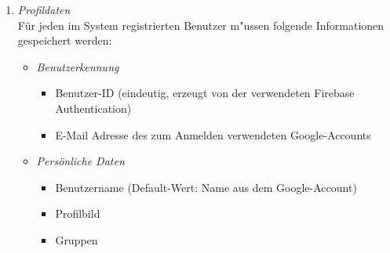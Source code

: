 \documentclass[parskip=full]{scrartcl}
\def\threedigits#1{%
  \ifnum#1<100 0\fi
  \ifnum#1<10 0\fi
  \number#1}
\begin{document}
\begin{enumerate}[label={\textbf{/D\protect\threedigits{\theenumi}0/}}, leftmargin=*]
	\item \textit{Profildaten} \label{Profildaten} \\Für jeden im System registrierten Benutzer m"ussen folgende Informationen gespeichert werden:
		\begin{itemize}
			\item \textit{Benutzerkennung}
				\begin{itemize}
					\item Benutzer-ID (eindeutig, erzeugt von der verwendeten Firebase Authentication)
					\item E-Mail Adresse des zum Anmelden verwendeten Google-Accounts
				\end{itemize}
			\item \textit{Persönliche Daten} \label{persönliche Daten} 
			\begin{itemize}
			\item \gls{Benutzername} (Default-Wert: Name aus dem Google-Account)
			\item \colorbox{shadecolor}{Profilbild}
			\item Gruppen
		\end{itemize}
		\end{itemize}
	

\end{enumerate}
\end{document}

